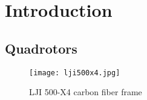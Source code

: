 \chapter{Introduction} \label{ch:introduction}

\section{Quadrotors}

\begin{figure}[h]
\begin{center}
\texttt{[image: lji500x4.jpg]}    
\caption[LJI 500-X4 carbon fiber frame]{LJI 500-X4 carbon fiber frame\protect\footnotemark} 
\label{fig:quadframe}
\end{center}
\end{figure}



